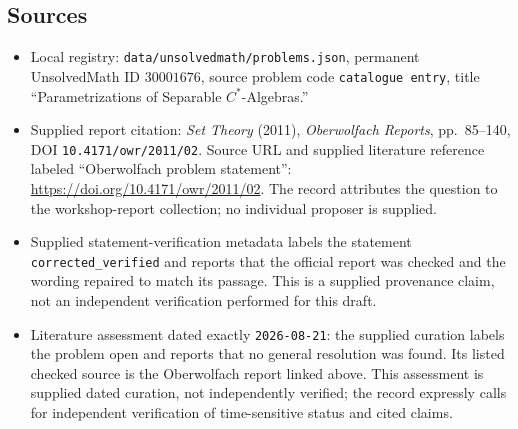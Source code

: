 \documentclass[11pt]{article}
\begin{document}
\subsection{Sources}
\begin{itemize}
\item Local registry: \texttt{data/unsolvedmath/problems.json}, permanent UnsolvedMath ID \(30001676\), source problem code \texttt{catalogue entry}, title ``Parametrizations of Separable \(C^*\)-Algebras.''
\item Supplied report citation: \emph{Set Theory} (2011), \emph{Oberwolfach Reports}, pp.\ 85--140, DOI \texttt{10.4171/owr/2011/02}. Source URL and supplied literature reference labeled ``Oberwolfach problem statement'': \url{https://doi.org/10.4171/owr/2011/02}. The record attributes the question to the workshop-report collection; no individual proposer is supplied.
\item Supplied statement-verification metadata labels the statement \texttt{corrected\_verified} and reports that the official report was checked and the wording repaired to match its passage. This is a supplied provenance claim, not an independent verification performed for this draft.
\item Literature assessment dated exactly \texttt{2026-08-21}: the supplied curation labels the problem open and reports that no general resolution was found. Its listed checked source is the Oberwolfach report linked above. This assessment is supplied dated curation, not independently verified; the record expressly calls for independent verification of time-sensitive status and cited claims.
\end{itemize}
\end{document}
